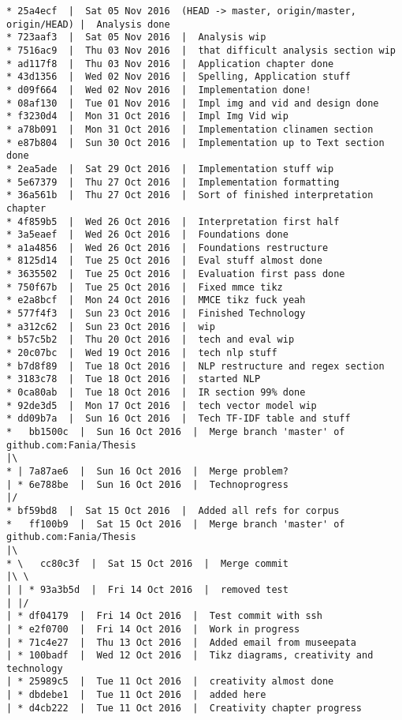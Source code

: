 \begin{verbatim}
* 25a4ecf  |  Sat 05 Nov 2016  (HEAD -> master, origin/master, origin/HEAD) |  Analysis done
* 723aaf3  |  Sat 05 Nov 2016  |  Analysis wip
* 7516ac9  |  Thu 03 Nov 2016  |  that difficult analysis section wip
* ad117f8  |  Thu 03 Nov 2016  |  Application chapter done
* 43d1356  |  Wed 02 Nov 2016  |  Spelling, Application stuff
* d09f664  |  Wed 02 Nov 2016  |  Implementation done!
* 08af130  |  Tue 01 Nov 2016  |  Impl img and vid and design done
* f3230d4  |  Mon 31 Oct 2016  |  Impl Img Vid wip
* a78b091  |  Mon 31 Oct 2016  |  Implementation clinamen section
* e87b804  |  Sun 30 Oct 2016  |  Implementation up to Text section done
* 2ea5ade  |  Sat 29 Oct 2016  |  Implementation stuff wip
* 5e67379  |  Thu 27 Oct 2016  |  Implementation formatting
* 36a561b  |  Thu 27 Oct 2016  |  Sort of finished interpretation chapter
* 4f859b5  |  Wed 26 Oct 2016  |  Interpretation first half
* 3a5eaef  |  Wed 26 Oct 2016  |  Foundations done
* a1a4856  |  Wed 26 Oct 2016  |  Foundations restructure
* 8125d14  |  Tue 25 Oct 2016  |  Eval stuff almost done
* 3635502  |  Tue 25 Oct 2016  |  Evaluation first pass done
* 750f67b  |  Tue 25 Oct 2016  |  Fixed mmce tikz
* e2a8bcf  |  Mon 24 Oct 2016  |  MMCE tikz fuck yeah
* 577f4f3  |  Sun 23 Oct 2016  |  Finished Technology
* a312c62  |  Sun 23 Oct 2016  |  wip
* b57c5b2  |  Thu 20 Oct 2016  |  tech and eval wip
* 20c07bc  |  Wed 19 Oct 2016  |  tech nlp stuff
* b7d8f89  |  Tue 18 Oct 2016  |  NLP restructure and regex section
* 3183c78  |  Tue 18 Oct 2016  |  started NLP
* 0ca80ab  |  Tue 18 Oct 2016  |  IR section 99% done
* 92de3d5  |  Mon 17 Oct 2016  |  tech vector model wip
* dd09b7a  |  Sun 16 Oct 2016  |  Tech TF-IDF table and stuff
*   bb1500c  |  Sun 16 Oct 2016  |  Merge branch 'master' of github.com:Fania/Thesis
|\  
* | 7a87ae6  |  Sun 16 Oct 2016  |  Merge problem?
| * 6e788be  |  Sun 16 Oct 2016  |  Technoprogress
|/  
* bf59bd8  |  Sat 15 Oct 2016  |  Added all refs for corpus
*   ff100b9  |  Sat 15 Oct 2016  |  Merge branch 'master' of github.com:Fania/Thesis
|\  
* \   cc80c3f  |  Sat 15 Oct 2016  |  Merge commit
|\ \  
| | * 93a3b5d  |  Fri 14 Oct 2016  |  removed test
| |/  
| * df04179  |  Fri 14 Oct 2016  |  Test commit with ssh
| * e2f0700  |  Fri 14 Oct 2016  |  Work in progress
| * 71c4e27  |  Thu 13 Oct 2016  |  Added email from museepata
| * 100badf  |  Wed 12 Oct 2016  |  Tikz diagrams, creativity and technology
| * 25989c5  |  Tue 11 Oct 2016  |  creativity almost done
| * dbdebe1  |  Tue 11 Oct 2016  |  added here
| * d4cb222  |  Tue 11 Oct 2016  |  Creativity chapter progress

\end{verbatim}
